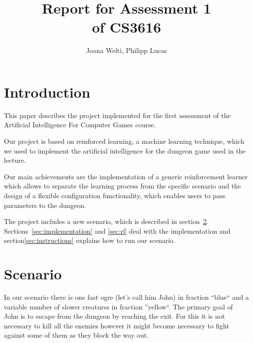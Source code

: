 \documentclass[a4paper,10pt]{scrartcl}
\title{Report for Assessment 1 \\ \large{of CS3616}}
\author{Joana Welti, Philipp Lucas}
\begin{document}

\maketitle
\newpage

\tableofcontents

\newpage


\section{Introduction}
This paper describes the project implemented for the first assessment of the Artificial Intelligence For Computer Games course. 

Our project is based on reinforced learning, a machine learning technique, which we used to implement the artificial intelligence for the dungeon game used in the lecture. 

Our main achievements are the implementation of a generic reinforcement learner which allows to separate the learning process from the specific scenario and the design of a flexible configuration functionality, which enables users to pass parameters to the dungeon. 

The project includes a new scenario, which is described in section~\ref{sec:scenario}. Sections~\ref{sec:implementation} and \ref{sec:rl} deal with the implementation and section\ref{sec:instructions} explains how to run our scenario. 
 
\section{Scenario}\label{sec:scenario}
In our scenario there is one fast ogre (let's call him John) in fraction ``blue`` and a variable number of slower creatures in fraction ''yellow``. The primary goal of John is to escape from the dungeon by reaching the exit. For this it is not necessary to kill all the enemies however it might become necessary to fight against some of them as they block the way out. 
\end{document}
